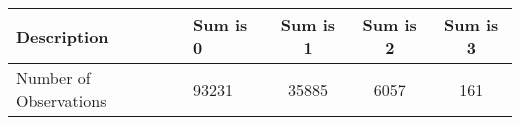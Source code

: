 \begin{tabular}{llccc}
  \hline
Description & Sum is 0 & Sum is 1 & Sum is 2 & Sum is 3 \\ 
  \hline
Number of Observations & 93231 & 35885 & 6057 & 161 \\ 
   \hline
\end{tabular}

